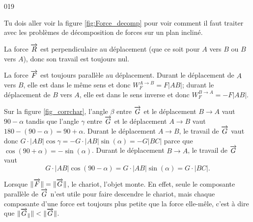 \begin{corrige}{019}


Tu dois aller voir la figure \ref{fig:Force_decomp} pour voir comment il faut traiter avec les problèmes de décomposition de forces sur un plan incliné.

La force $\overrightarrow{R}$ est perpendiculaire au déplacement (que ce soit pour $A$ vers $B$ ou $B$ vers $A$), donc son travail est toujours nul.

La force $\overrightarrow{F}$ est toujours parallèle au déplacement. Durant le déplacement de $A$ vers $B$, elle est dans le même sens et donc $W_F^{A\to B}=F| AB |$; durant le déplacement de $B$ vers $A$, elle est dans le sens inverse et donc $W_F^{B\to A}=-F| AB |$.

Sur la figure \ref{fig_corrchar}, l'angle $\beta$ entre $\overrightarrow{G}$ et le déplacement $B\to A$ vaut $90-\alpha$ tandis que l'angle $\gamma$ entre $\overrightarrow{G}$ et le déplacement $A\to B$ vaut $180-(90-\alpha)=90+\alpha$.
Durant le déplacement $A\to B$, le travail de $\overrightarrow{G}$ vaut donc $G\cdot| AB |\cos\gamma=-G\cdot| AB |\sin(\alpha)=-G| BC |$ parce que $\cos(90+\alpha)=-\sin(\alpha)$.
Durant le déplacement $B\to A$, le travail de $\overrightarrow{G}$ vaut 
\[
G\cdot| AB |\cos(90-\alpha)=G\cdot| AB |\sin(\alpha)=G\cdot| BC |.
\]

Lorsque $\| \overrightarrow{F} \|=\| \overrightarrow{G} \|$, le chariot, l'objet monte. En effet, seule le composante parallèle de $\overrightarrow{G}$ n'est utile pour faire descendre le chariot, mais chaque composante d'une force est toujours plus petite que la force elle-mêle, c'est à dire que $\| \overrightarrow{G}_{\parallel} \|<\| \overrightarrow{G} \|$.

\end{corrige}
